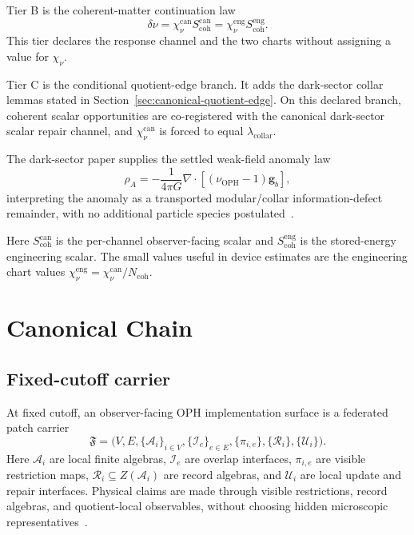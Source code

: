 \documentclass[11pt]{article}
\numberwithin{equation}{section}
\theoremstyle{remark}
\newcommand{\chinu}{\chi_\nu}
\newcommand{\chican}{\chi_\nu^{\mathrm{can}}}
\newcommand{\chieng}{\chi_\nu^{\mathrm{eng}}}
\newcommand{\scohcan}{S_{\mathrm{coh}}^{\mathrm{can}}}
\newcommand{\scoheng}{S_{\mathrm{coh}}^{\mathrm{eng}}}
\newcommand{\Ncoh}{N_{\mathrm{coh}}}
\newcommand{\nuoph}{\nu_{\mathrm{OPH}}}
\newcommand{\gbar}{\mathbf g_b}
\newcommand{\A}{\mathcal A}
\newcommand{\I}{\mathcal I}
\newcommand{\Ralg}{\mathcal R}
\newcommand{\U}{\mathcal U}
\newcommand{\rhoa}{\rho_A}
\newcommand{\lambdac}{\lambda_{\mathrm{collar}}}
\begin{document}
Tier B is the coherent-matter continuation law
\begin{equation}
\delta\nu
=
\chican\scohcan
=
\chieng\scoheng.
\label{eq:chinu-law}
\end{equation}
This tier declares the response channel and the two charts without assigning a
value for \(\chinu\).

Tier C is the conditional quotient-edge branch. It adds the dark-sector collar
lemmas stated in Section~\ref{sec:canonical-quotient-edge}. On this declared
branch, coherent scalar opportunities are co-registered with the canonical
dark-sector scalar repair channel, and \(\chican\) is forced to equal
\(\lambdac\).

The dark-sector paper supplies the settled weak-field anomaly law
\begin{equation}
\rhoa
=
-\frac{1}{4\pi G}
\nabla\cdot[(\nuoph-1)\gbar],
\label{eq:canonical-dark}
\end{equation}
interpreting the anomaly as a transported modular/collar information-defect
remainder, with no additional particle species postulated~\cite{oph-dark}.

Here \(\scohcan\) is the per-channel observer-facing scalar and \(\scoheng\)
is the stored-energy engineering scalar. The small values useful in device
estimates are the engineering chart values \(\chieng=\chican/\Ncoh\).

\section{Canonical Chain}

\subsection{Fixed-cutoff carrier}

At fixed cutoff, an observer-facing OPH implementation surface is a federated
patch carrier
\begin{equation}
\mathfrak F
=
\bigl(V,E,\{\A_i\}_{i\in V},\{\I_e\}_{e\in E},
\{\pi_{i,e}\},\{\Ralg_i\},\{\U_i\}\bigr).
\end{equation}
Here \(\A_i\) are local finite algebras, \(\I_e\) are overlap interfaces,
\(\pi_{i,e}\) are visible restriction maps, \(\Ralg_i\subseteq Z(\A_i)\) are
record algebras, and \(\U_i\) are local update and repair interfaces. Physical
claims are made through visible restrictions, record algebras, and quotient-local
observables, without choosing hidden microscopic representatives~\cite{oph-micro}.
\end{document}
